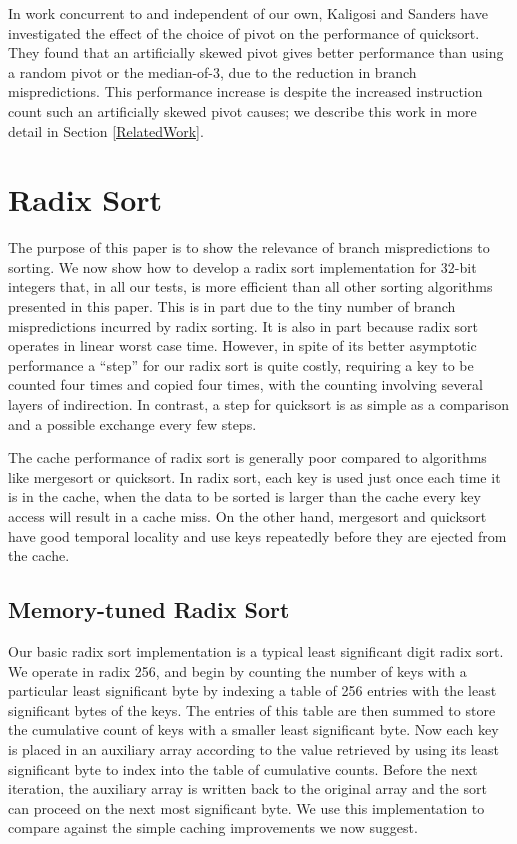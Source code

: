 \documentclass[acmtocl]{acmtrans2m}
\begin{document}
In work concurrent to and independent of our own, Kaligosi and Sanders
\citeyear{Kaligosi+06} have investigated the effect of the choice of pivot on
the performance of quicksort. They found that an artificially skewed pivot gives
better performance than using a random pivot or the median-of-3, due to the
reduction in branch mispredictions. This performance increase is despite the
increased instruction count such an artificially skewed pivot causes; we
describe this work in more detail in Section \ref{RelatedWork}.


\section{Radix Sort}
\label{Radixsort}

The purpose of this paper is to show the relevance of branch mispredictions to
sorting. We now show how to develop a  radix sort \cite{Friend56} implementation
for 32-bit integers that, in all our tests, is more efficient than all other
sorting algorithms presented in this paper.  This is in part due to the tiny
number of branch mispredictions incurred by radix sorting. It is also in part
because radix sort operates in linear worst case time. However, in spite of its
better asymptotic performance a ``step'' for our radix sort is quite costly,
requiring a key to be counted four times and copied four times, with the
counting involving several layers of indirection. In contrast, a step for
quicksort is as simple as a comparison and a possible exchange every few steps. 

The cache performance of radix sort is generally poor compared to algorithms
like mergesort or quicksort. In radix sort, each key is used just once each time
it is in the cache, when the data to be sorted is larger than the cache every
key access will result in a cache miss. On the other hand, mergesort and
quicksort have good temporal locality and use keys repeatedly before they are
ejected from the cache.

\subsection{Memory-tuned Radix Sort}

Our basic radix sort implementation is a typical least significant digit radix
sort. We operate in radix 256, and begin by counting the number of keys with a
particular least significant byte by indexing a table of 256 entries with the
least significant bytes of the keys. The entries of this table are then summed
to store the cumulative count of keys with a smaller least significant byte. Now
each key is placed in an auxiliary array according to the value retrieved by
using its least significant byte to index into the table of cumulative counts.
Before the next iteration, the auxiliary array is written back to the original
array and the sort can proceed on the next most significant byte. We use this
implementation to compare against the simple caching improvements we now
suggest.
\end{document}
